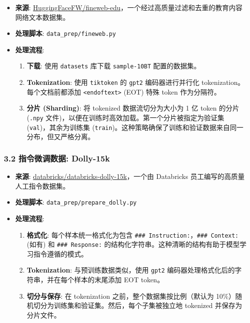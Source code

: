 \documentclass[a4paper]{article}
\providecommand{\tightlist}{%
  \setlength{\itemsep}{0pt}\setlength{\parskip}{0pt}}
\begin{document}
\begin{itemize}
\tightlist
\item
  \textbf{来源}:
  \href{https://huggingface.co/datasets/HuggingFaceFW/fineweb-edu}{HuggingFaceFW/fineweb-edu}，一个经过高质量过滤和去重的教育内容网络文本数据集。
\item
  \textbf{处理脚本}: \texttt{data\_prep/fineweb.py}
\item
  \textbf{处理流程}:

  \begin{enumerate}
  \def\labelenumi{\arabic{enumi}.}
  \tightlist
  \item
    \textbf{下载}: 使用 \texttt{datasets} 库下载 \texttt{sample-10BT}
    配置的数据集。
  \item
    \textbf{Tokenization}: 使用 \texttt{tiktoken} 的 \texttt{gpt2}
    编码器进行并行化 tokenization。每个文档前都添加
    \texttt{\textless{}\textbar{}endoftext\textbar{}\textgreater{}}
    (EOT) 特殊 token 作为分隔符。
  \item
    \textbf{分片 (Sharding)}: 将 tokenized 数据流切分为大小为 1 亿 token
    的分片 (\texttt{.npy}
    文件)，以便在训练时高效加载。第一个分片被指定为验证集
    (\texttt{val})，其余为训练集
    (\texttt{train})。这种策略确保了训练和验证数据来自同一分布，但又严格分离。
  \end{enumerate}
\end{itemize}

\subsubsection{3.2 指令微调数据:
Dolly-15k}\label{ux6307ux4ee4ux5faeux8c03ux6570ux636e-dolly-15k}

\begin{itemize}
\tightlist
\item
  \textbf{来源}:
  \href{https://huggingface.co/datasets/databricks/databricks-dolly-15k}{databricks/databricks-dolly-15k}，一个由
  Databricks 员工编写的高质量人工指令数据集。
\item
  \textbf{处理脚本}: \texttt{data\_prep/prepare\_dolly.py}
\item
  \textbf{处理流程}:

  \begin{enumerate}
  \def\labelenumi{\arabic{enumi}.}
  \tightlist
  \item
    \textbf{格式化}: 每个样本统一格式化为包含
    \texttt{\#\#\#\ Instruction:}，\texttt{\#\#\#\ Context:} (如有) 和
    \texttt{\#\#\#\ Response:}
    的结构化字符串。这种清晰的结构有助于模型学习指令遵循的模式。
  \item
    \textbf{Tokenization}: 与预训练数据类似，使用 \texttt{gpt2}
    编码器处理格式化后的字符串，并在每个样本的末尾添加 EOT token。
  \item
    \textbf{切分与保存}: 在 tokenization 之前，整个数据集按比例（默认为
    10\%）随机切分为训练集和验证集。然后，每个子集被独立地 tokenized
    并保存为分片文件。
  \end{enumerate}
\end{itemize}
\end{document}
